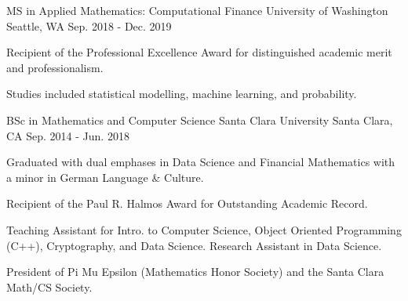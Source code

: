

\begin{cventries}

  \cventry
    {MS in Applied Mathematics: Computational Finance} %
    {University of Washington} %
    {Seattle, WA} %
    {Sep. 2018 - Dec. 2019} %
    {
      \begin{cvitems} %
        \item {Recipient of the Professional Excellence Award for distinguished academic merit and professionalism.}
        \item {Studies included statistical modelling, machine learning, and probability.}
      \end{cvitems}
    }

  \cventry
    {BSc in Mathematics and Computer Science} %
    {Santa Clara University} %
    {Santa Clara, CA} %
    {Sep. 2014 - Jun. 2018} %
    {
      \begin{cvitems} %
        \item {Graduated with dual emphases in Data Science and Financial Mathematics with a minor in German Language \& Culture.}
        \item {Recipient of the Paul R. Halmos Award for Outstanding Academic Record.}
        \item {Teaching Assistant for Intro. to Computer Science, Object Oriented Programming (C++), Cryptography, and Data Science. Research Assistant in Data Science.}
        \item {President of Pi Mu Epsilon (Mathematics Honor Society) and the Santa Clara Math/CS Society.}
      \end{cvitems}
    }

\end{cventries}
